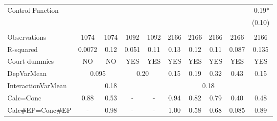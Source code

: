 \begin{tabular}{lccccccccc}
Control Function &       &       &       &       &       &       &       &       & -0.19* \\
      &       &       &       &       &       &       &       &       & (0.10) \\
      &       &       &       &       &       &       &       &       &  \\
\midrule
Observations & 1074  & 1074  & 1092  & 1092  & 2166  & 2166  & 2166  & 2166  & 2166 \\
R-squared & 0.0072 & 0.12  & 0.051 & 0.11  & 0.13  & 0.12  & 0.11  & 0.087 & 0.135 \\
Court dummies  & NO    & NO    & YES   & YES   & YES   & YES   & YES   & YES   & YES \\
DepVarMean & \multicolumn{2}{c}{0.095} & \multicolumn{2}{c}{0.20} & 0.15  & 0.19  & 0.32  & 0.43  & 0.15 \\
InteractionVarMean &       & 0.18  &       & \multicolumn{6}{c}{0.18} \\
Calc=Conc & 0.88  & 0.53  & -     & -     & 0.94  & 0.82  & 0.79  & 0.40  & 0.48 \\
Calc\#EP=Conc\#EP & -     & 0.98  & -     & -     & 1.00  & 0.58  & 0.68  & 0.085 & 0.89 \\
\bottomrule
\bottomrule
\end{tabular}%
